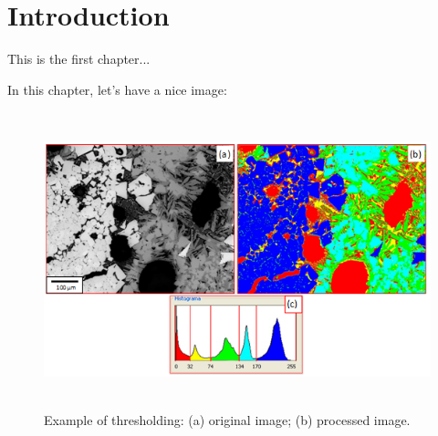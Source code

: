 
\chapter{Introduction}

This is the first chapter...

In this chapter, let's have a nice image:

\begin{figure} [h]
  \begin{center}
    \includegraphics[height=243pt,width=400pt]{images/fig2-6}
    \caption{Example of thresholding: (a) original image; (b) processed
      image.\cite{74}}\label{fig:2-6}
  \end{center}
\end{figure}
